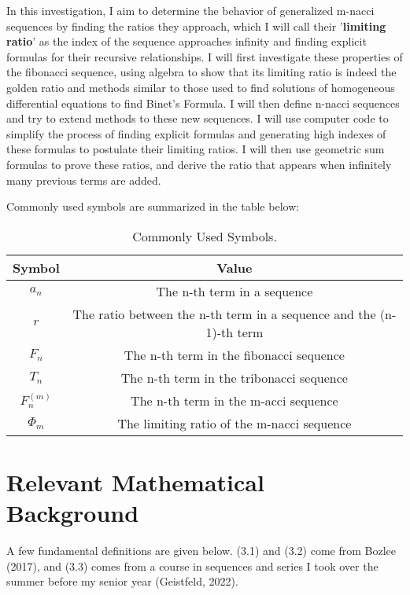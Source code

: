 \documentclass[11pt]{article}
\begin{document}
In this investigation, I aim to determine the behavior of generalized m-nacci sequences by finding the ratios they approach, which I will call their '\textbf{limiting ratio}’ as the index of the sequence approaches infinity and finding explicit formulas for their recursive relationships. I will first investigate these properties of the fibonacci sequence, using algebra to show that its limiting ratio is indeed the golden ratio and methods similar to those used to find solutions of homogeneous differential equations to find Binet’s Formula. I will then define n-nacci sequences and try to extend methods to these new sequences. I will use computer code to simplify the process of finding explicit formulas and generating high indexes of these formulas to postulate their limiting ratios. I will then use geometric sum formulas to prove these ratios, and derive the ratio that appears when infinitely many previous terms are added. 

\noindent Commonly used symbols are summarized in the table below:

\begin{table}[h]
\begin{center}
    \begin{tabular}{ |c|c| } 
    \hline
    \textbf{Symbol} & \textbf{Value} \\
    \hline
    $a_n$ & The n-th term in a sequence \\ 
    \hline
    $r$ & The ratio between the n-th term in a sequence and the (n-1)-th term \\ 
    \hline
    $F_n$ & The n-th term in the fibonacci sequence \\
    \hline
    $T_n$ & The n-th term in the tribonacci sequence \\
    \hline
    $F^{(m)}_n$ & The n-th term in the m-acci sequence \\ 
    \hline
    $\Phi_m$ & The limiting ratio of the m-nacci sequence \\
    \hline
    \end{tabular}
    \caption{Commonly Used Symbols.}
\label{table:1}
\end{center}
\end{table}




\section{Relevant Mathematical Background}
A few fundamental definitions are given below. (3.1) and (3.2) come from Bozlee (2017), and (3.3) comes from a course in sequences and series I took over the summer before my senior year (Geistfeld, 2022).
\end{document}
